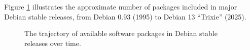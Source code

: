 Figure \ref{fig:pkg_growth} illustrates the approximate number of packages included in major Debian stable releases, from Debian 0.93 (1995) to Debian 13 ``Trixie'' (2025).

\begin{figure}[htbp]
    \centering
    \textwidth
    \caption{The trajectory of available software packages in Debian stable releases over time.}
    \label{fig:pkg_growth}
\end{figure}





